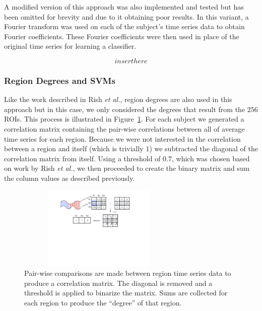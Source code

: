 \documentclass{article} %
\begin{document}
A modified version of this approach was also implemented and tested but has
been omitted for brevity and due to it obtaining poor results. In this variant,
a Fourier transform was used on each of the subject's time series data to 
obtain Fourier coefficients. These Fourier coefficients were then used in 
place of the original time series for learning a classifier.

\begin{equation}
insert here
\end{equation}


\subsubsection{Region Degrees and SVMs}

Like the work described in Rish \emph{et al.}, region degrees are also used in
this approach but in this case, we only considered the degrees that result from
the $256$ ROIs. This process is illustrated in Figure~\ref{fig:degree_calc}. For each subject 
we generated a correlation matrix containing the pair-wise correlations between 
all of average time series for each region. Because we were not 
interested in the correlation between a region and itself (which is trivially 
$1$) we subtracted the diagonal of the correlation matrix from itself. Using a
threshold of $0.7$, which was chosen based on work by Rish \emph{et al.}, we
then proceeded to create the binary matrix and sum the column values as 
described previously.

\begin{figure}[!htb]
  \centering
  \includegraphics[width=0.7\textwidth, height=4.0cm]{diagrams/ROI_deg_img.pdf}
  \caption{Pair-wise comparisons are made between region time series data to
  produce a correlation matrix. The diagonal is removed and a threshold is
  applied to binarize the matrix. Sums are collected for each region to
  produce the ``degree'' of that region.}
  \label{fig:degree_calc}
\end{figure}
\end{document}
